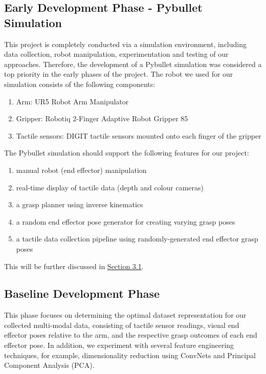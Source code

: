 \documentclass[11pt, a4paper]{report}
\begin{document}
\subsection{Early Development Phase - Pybullet Simulation}
\label{sec:1.4.2}
This project is completely conducted via a simulation environment, including data collection, robot manipulation, experimentation and testing of our approaches. Therefore, the development of a Pybullet simulation was considered a top priority in the early phases of the project. The robot we used for our simulation consists of the following components:
\begin{enumerate}
    \item Arm: UR5 Robot Arm Manipulator
    \item Gripper: Robotiq 2-Finger Adaptive Robot Gripper 85
    \item Tactile sensors: DIGIT tactile sensors \cite{Lambeta2020DIGIT} mounted onto each finger of the gripper
\end{enumerate}
The Pybullet simulation should support the following features for our project:
\begin{enumerate}
    \item manual robot (end effector) manipulation
    \item real-time display of tactile data (depth and colour cameras)
    \item a grasp planner using inverse kinematics
    \item a random end effector pose generator for creating varying grasp poses
    \item a tactile data collection pipeline using randomly-generated end effector grasp poses
\end{enumerate}
\noindent This will be further discussed in \hyperref[sec:3.1]{Section 3.1}.


\subsection{Baseline Development Phase}
\label{sec:1.4.3}
This phase focuses on determining the optimal dataset representation for our collected multi-modal data, consisting of tactile sensor readings, visual end effector poses relative to the arm, and the respective grasp outcomes of each end effector pose. In addition, we experiment with several feature engineering techniques, for example, dimensionality reduction using ConvNets and Principal Component Analysis (PCA).
\end{document}
